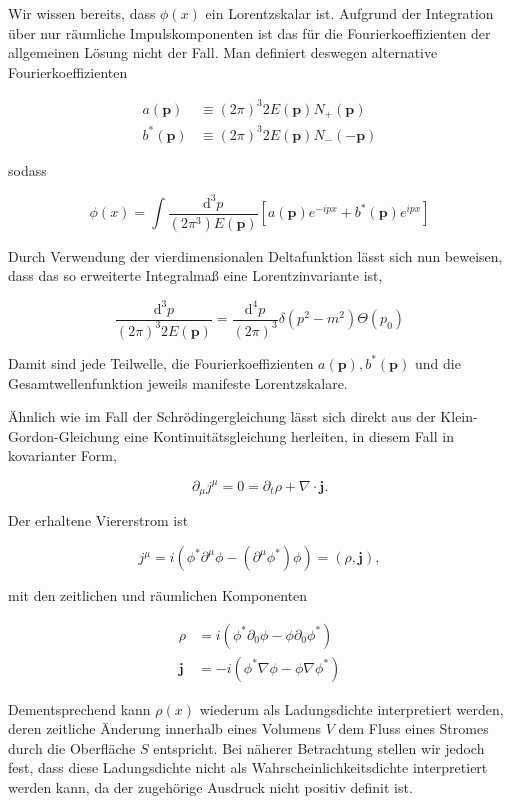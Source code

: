 \documentclass[10pt, letterpaper]{article}
\begin{document}
Wir wissen bereits, dass $\phi(x)$ ein Lorentzskalar ist. Aufgrund der Integration über nur räumliche Impulskomponenten ist das für die Fourierkoeffizienten der allgemeinen Lösung nicht der Fall. Man definiert deswegen alternative Fourierkoeffizienten

$$
\begin{aligned}
a(\mathbf{p}) & \equiv(2 \pi)^{3} 2 E(\mathbf{p}) N_{+}(\mathbf{p}) \\
b^{*}(\mathbf{p}) & \equiv(2 \pi)^{3} 2 E(\mathbf{p}) N_{-}(-\mathbf{p})
\end{aligned}
$$

sodass

$$
\phi(x)=\int \frac{\mathrm{d}^{3} p}{\left(2 \pi^{3}\right) E(\mathbf{p})}\left[a(\mathbf{p}) e^{-i p x}+b^{*}(\mathbf{p}) e^{i p x}\right]
$$

Durch Verwendung der vierdimensionalen Deltafunktion lässt sich nun beweisen, dass das so erweiterte Integralmaß eine Lorentzinvariante ist,

$$
\frac{\mathrm{d}^{3} p}{(2 \pi)^{3} 2 E(\mathbf{p})}=\frac{\mathrm{d}^{4} p}{(2 \pi)^{3}} \delta\left(p^{2}-m^{2}\right) \Theta\left(p_{0}\right)
$$

Damit sind jede Teilwelle, die Fourierkoeffizienten $a(\mathbf{p}), b^{*}(\mathbf{p})$ und die Gesamtwellenfunktion jeweils manifeste Lorentzskalare.

Ähnlich wie im Fall der Schrödingergleichung lässt sich direkt aus der Klein-Gordon-Gleichung eine Kontinuitätsgleichung herleiten, in diesem Fall in kovarianter Form,

$$
\partial_{\mu} j^{\mu}=0=\partial_{t} \rho+\nabla \cdot \mathbf{j} .
$$

Der erhaltene Viererstrom ist

$$
j^{\mu}=i\left(\phi^{*} \partial^{\mu} \phi-\left(\partial^{\mu} \phi^{*}\right) \phi\right)=(\rho, \mathbf{j}),
$$

mit den zeitlichen und räumlichen Komponenten

$$
\begin{aligned}
\rho & =i\left(\phi^{*} \partial_{0} \phi-\phi \partial_{0} \phi^{*}\right) \\
\mathbf{j} & =-i\left(\phi^{*} \nabla \phi-\phi \nabla \phi^{*}\right)
\end{aligned}
$$

Dementsprechend kann $\rho(x)$ wiederum als Ladungsdichte interpretiert werden, deren zeitliche Änderung innerhalb eines Volumens $V$ dem Fluss eines Stromes durch die Oberfläche $S$ entspricht. Bei näherer Betrachtung stellen wir jedoch fest, dass diese Ladungsdichte nicht als Wahrscheinlichkeitsdichte interpretiert werden kann, da der zugehörige Ausdruck nicht positiv definit ist.
\end{document}
